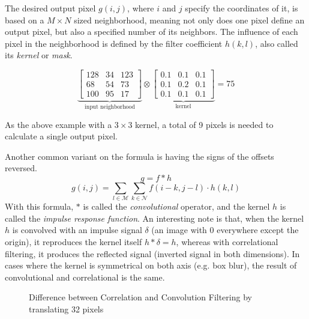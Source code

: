 \documentclass[twoside,a4paper,article]{combine}
\begin{document}
The desired output pixel $g(i, j)$, where $i$ and $j$ specify the
coordinates of it, is based on a $M \times N$ sized neighborhood, 
meaning not only does one pixel define an output pixel, but also a specified number
of its neighbors. The influence of each pixel in the neighborhood is defined by the filter coefficient $h(k, l)$,
also called its \emph{kernel} or \emph{mask}\cite{Szeliski_2022}.

\[
\underbrace{
    \begin{bmatrix}
        128 & 34 & 123\\
        68 & 54 & 73 \\
        100 & 95 & 17
    \end{bmatrix}}_{\text{input neighborhood}}
\otimes
\underbrace{
    \begin{bmatrix}
        0.1 & 0.1 & 0.1\\
        0.1 & 0.2 & 0.1\\
        0.1 & 0.1 & 0.1
    \end{bmatrix}}_{\text{kernel}}
= 75
\]

As the above example with a $3 \times 3$ kernel, a total of 9 pixels is needed to calculate a single output pixel.

Another common variant on the formula is having the signs of the offsets reversed. 
\[
    g = f \ast h
\]
\[
    g(i,j) = \sum_{l \in \mathscr{M}}\sum_{k \in \mathscr{N}}{f(i-k, j-l) \cdot h(k, l)}
\]
With this formula, $\ast$ is called the \emph{convolutional} operator, and the kernel $h$ is called the \emph{impulse response function}. 
An interesting note is that, when the kernel $h$ is convolved with an impulse signal $\delta$ (an image with 0 everywhere except the origin),
it reproduces the kernel itself $h \ast \delta = h$, whereas with correlational filtering, 
it produces the reflected signal (inverted signal in both dimensions).\cite{Szeliski_2022} In cases
where the kernel is symmetrical on both axis (e.g. box blur), the result of convolutional and correlational is the same.

\begin{minipage}{\textwidth}\begin{figure}[H]
    \centering
    \caption{Difference between Correlation and Convolution Filtering by translating 32 pixels}
\end{figure}\end{minipage}
\end{document}
